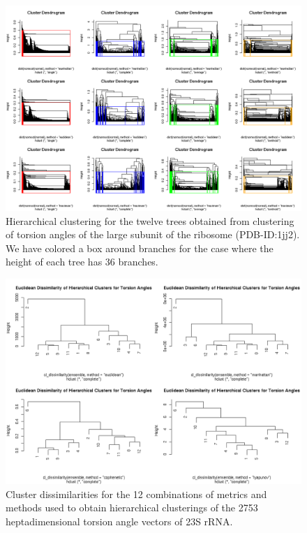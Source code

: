 \begin{figure}[htbp]
\centering
\includegraphics[angle=90, scale=0.55]{treetor_hc.png}
\caption{Hierarchical clustering for the twelve trees
obtained from clustering of torsion angles of the large subunit of 
the ribosome (PDB-ID:1jj2). We have colored a box around branches for the
case where the height of each tree has 36 branches.}
\label{fig:hclus}
\end{figure}

\begin{figure}[htbp]
\centering
\includegraphics[angle=90, scale=0.60]{clusdissimtor_hc.png}
\caption{Cluster dissimilarities for the 12 combinations of 
metrics and methods used to obtain hierarchical clusterings of the 2753 
heptadimensional torsion  angle vectors of 23S rRNA.}
\label{fig:clusdissim}
\end{figure}


